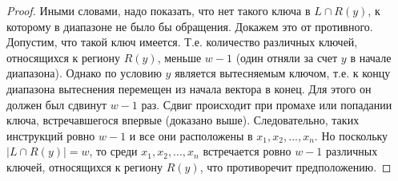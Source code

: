 \begin{proof}
  Иными словами, надо показать, что нет такого ключа в $L \cap R(y)$,
  к которому в диапазоне не было бы обращения. Докажем это от противного.
  Допустим, что такой ключ имеется. Т.е. количество различных ключей,
  относящихся к региону $R(y)$, меньше $w{-}1$ (один отняли за счет $y$ в начале диапазона).
  Однако по условию $y$ является вытесняемым ключом, т.е. к
  концу диапазона вытеснения перемещен из начала вектора в конец. Для
  этого он должен был сдвинут $w{-}1$ раз. Сдвиг происходит при
  промахе или попадании ключа, встречавшегося впервые
  (доказано выше). Следовательно, таких инструкций ровно $w-1$ и все они расположены
  в $x_1, x_2, ..., x_n$. Но поскольку $| L \cap R(y) | = w$, то
  среди $x_1, x_2, ..., x_n$ встречается ровно $w-1$ различных
  ключей, относящихся к региону $R(y)$, что противоречит
  предположению.
\end{proof}

